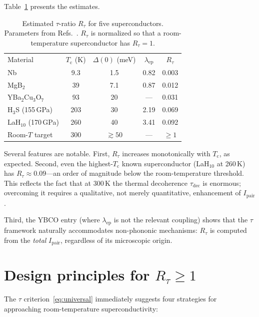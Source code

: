 \documentclass[prb,twocolumn,superscriptaddress,longbibliography,floatfix]{revtex4-2}
\newcommand{\tauasym}{\tau}
\newcommand{\taudec}{\tauasym_{\mathrm{dec}}}
\newcommand{\Ipair}{I_{\mathrm{pair}}}
\newcommand{\Rtau}{R_{\tauasym}}
\newcommand{\Tc}{T_{\mathrm{c}}}
\begin{document}
Table~\ref{tab:screening} presents the estimates.

\begin{table}[t]
\caption{\label{tab:screening}Estimated $\tauasym$-ratio
$\Rtau$ for five superconductors.  Parameters from
Refs.~\cite{Allen1975,Choi2002,Drozdov2015,Liu2017,Errea2020}.
$\Rtau$ is normalized so that a room-temperature superconductor
has $\Rtau = 1$.}
\begin{ruledtabular}
\begin{tabular}{lcccc}
Material & $\Tc$ (K) & $\Delta(0)$ (meV) & $\lambda_{\mathrm{ep}}$ & $\Rtau$ \\
\colrule
Nb       &    9.3 & 1.5  & 0.82 & 0.003 \\
MgB$_2$  &   39   & 7.1  & 0.87 & 0.012 \\
YBa$_2$Cu$_3$O$_{7}$ & 93 & 20 & --- & 0.031 \\
H$_3$S (155\,GPa) & 203 & 30  & 2.19 & 0.069 \\
LaH$_{10}$ (170\,GPa) & 260 & 40 & 3.41 & 0.092 \\
\colrule
Room-$T$ target & 300 & $\gtrsim 50$ & --- & $\geq 1$ \\
\end{tabular}
\end{ruledtabular}
\end{table}

Several features are notable.  First, $\Rtau$ increases
monotonically with $\Tc$, as expected.  Second, even the
highest-$\Tc$ known superconductor (LaH$_{10}$ at 260\,K)
has $\Rtau \approx 0.09$---an order of magnitude below the
room-temperature threshold.  This reflects the fact that at
300\,K the thermal decoherence $\taudec$ is enormous;
overcoming it requires a qualitative, not merely quantitative,
enhancement of $\Ipair$.

Third, the YBCO entry (where $\lambda_{\mathrm{ep}}$ is
not the relevant coupling) shows that the $\tauasym$ framework
naturally accommodates non-phononic mechanisms: $\Rtau$ is
computed from the \emph{total} $\Ipair$, regardless of its
microscopic origin.

\section{Design principles for $\Rtau \geq 1$}
\label{sec:design}

The $\tauasym$ criterion~\eqref{eq:universal} immediately
suggests four strategies for approaching room-temperature
superconductivity:
\end{document}
